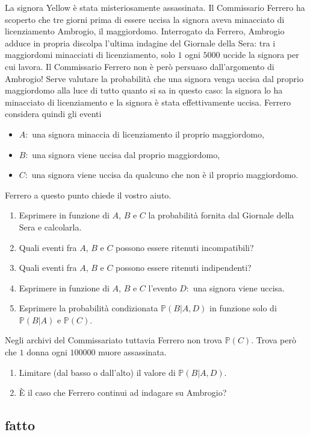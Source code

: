 La signora Yellow è stata misteriosamente assassinata. Il Commissario Ferrero ha scoperto che tre giorni prima di essere uccisa la signora aveva minacciato di licenziamento Ambrogio, il maggiordomo. Interrogato da Ferrero, Ambrogio adduce in propria discolpa l'ultima indagine del Giornale della Sera: tra i maggiordomi minacciati di licenziamento, solo $1$ ogni $5000$ uccide la signora per cui lavora. Il Commissario Ferrero non è però persuaso dall'argomento di Ambrogio! Serve valutare la probabilità che una signora venga uccisa dal proprio maggiordomo alla luce di tutto quanto si sa in questo caso: la signora lo ha minacciato di licenziamento e la signora è stata effettivamente uccisa. Ferrero considera quindi gli eventi
\begin{itemize}
\item $A:$ una signora minaccia di licenziamento il proprio maggiordomo,
\item $B:$ una signora viene uccisa dal proprio maggiordomo,
\item $C:$ una signora viene uccisa da qualcuno che non è il proprio maggiordomo.
\end{itemize}

Ferrero a questo punto chiede il vostro aiuto.
\begin{enumerate}
\item Esprimere in funzione di $A$, $B$ e $C$ la probabilità fornita dal Giornale della Sera e calcolarla.
\item Quali eventi fra $A$, $B$ e $C$ possono essere ritenuti incompatibili?
\item Quali eventi fra $A$, $B$ e $C$ possono essere ritenuti indipendenti?
\item Esprimere in funzione di $A$, $B$ e $C$ l'evento $D:$ una signora viene uccisa.
\item Esprimere la probabilità condizionata $\mathbb{P}( B|A,D)$ in funzione solo di $\mathbb{P}( B|A)$ e $\mathbb{P}( C)$.
\end{enumerate}

Negli archivi del Commissariato tuttavia Ferrero non trova $\mathbb{P}( C)$. Trova però che $1$ donna ogni $100000$ muore assassinata.
\begin{enumerate}
\item Limitare (dal basso o dall'alto) il valore di $\mathbb{P}( B|A,D)$.
\item È il caso che Ferrero continui ad indagare su Ambrogio?
\end{enumerate}
\subsection{fatto}


